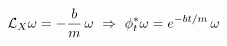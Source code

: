 \documentclass[preview]{standalone}
\begin{document}
\begin{align*}
\special{dvisvgm:raw <g id='unique000'>}\mathcal{L}_X\omega=-\frac bm\,\omega\ \Rightarrow\ \phi_t^*\omega=e^{-bt/m}\,\omega\special{dvisvgm:raw </g>}
\end{align*}
\end{document}
